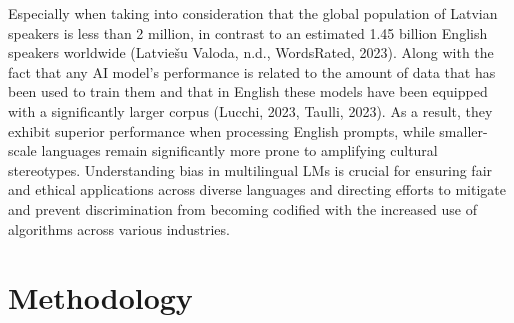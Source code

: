 \documentclass[11pt,twocolumn]{article}
\begin{document}
Especially when taking into consideration that the global population of Latvian speakers is less than 2 million, in contrast to an estimated 1.45 billion English speakers worldwide (Latviešu Valoda, n.d., WordsRated, 2023). Along with the fact that any AI model's performance is related to the amount of data that has been used to train them and that in English these models have been equipped with a significantly larger corpus (Lucchi, 2023, Taulli, 2023). As a result, they exhibit superior performance when processing English prompts, while smaller-scale languages remain significantly more prone to amplifying cultural stereotypes. Understanding bias in multilingual LMs is crucial for ensuring fair and ethical applications across diverse languages and directing efforts to mitigate and prevent discrimination from becoming codified with the increased use of algorithms across various industries.

\section{Methodology}
\end{document}
